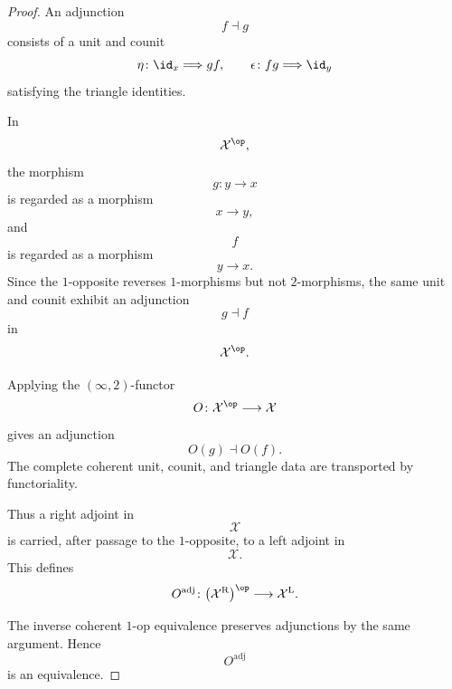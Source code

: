 \begin{proof}
An adjunction
\[
    f\dashv g
\]
consists of a unit and counit
\[
    \eta
    \colon
    \id_x
    \Longrightarrow
    gf,
    \qquad
    \epsilon
    \colon
    fg
    \Longrightarrow
    \id_y
\]
satisfying the triangle identities.

In
\[
    \mathcal X^{\op},
\]
the morphism
\[
    g
    \colon
    y
    \longrightarrow
    x
\]
is regarded as a morphism
\[
    x
    \longrightarrow
    y,
\]
and
\[
    f
\]
is regarded as a morphism
\[
    y
    \longrightarrow
    x.
\]
Since the $1$-opposite reverses $1$-morphisms but not $2$-morphisms, the
same unit and counit exhibit an adjunction
\[
    g\dashv f
\]
in
\[
    \mathcal X^{\op}.
\]

Applying the $(\infty,2)$-functor
\[
    O
    \colon
    \mathcal X^{\op}
    \longrightarrow
    \mathcal X
\]
gives an adjunction
\[
    O(g)\dashv O(f).
\]
The complete coherent unit, counit, and triangle data are transported by
functoriality.

Thus a right adjoint in
\[
    \mathcal X
\]
is carried, after passage to the $1$-opposite, to a left adjoint in
\[
    \mathcal X.
\]
This defines
\[
    O^{\mathrm{adj}}
    \colon
    \bigl(
        \mathcal X^{\mathrm R}
    \bigr)^{\op}
    \longrightarrow
    \mathcal X^{\mathrm L}.
\]

The inverse coherent $1$-op equivalence preserves adjunctions by the same
argument. Hence
\[
    O^{\mathrm{adj}}
\]
is an equivalence.
\end{proof}

